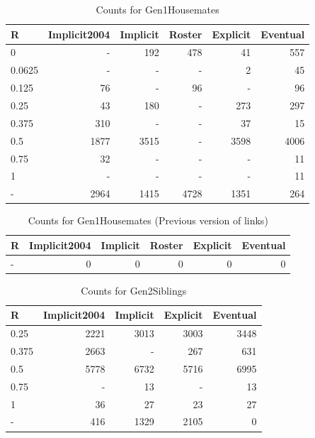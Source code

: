 \documentclass[a4paper]{article}\usepackage[]{graphicx}\usepackage[]{color}
\begin{document}
\begin{table}[ht]
\centering
\begingroup\large
\begin{tabular}{lrrrrr}
  \hline
R & Implicit2004 & Implicit & Roster & Explicit & Eventual \\ 
  \hline
0 & - & 192 & 478 &  41 & 557 \\ 
  0.0625 & - & - & - &   2 &  45 \\ 
  0.125 &  76 & - &  96 & - &  96 \\ 
  0.25 &  43 & 180 & - & 273 & 297 \\ 
  0.375 & 310 & - & - &  37 &  15 \\ 
  0.5 & 1877 & 3515 & - & 3598 & 4006 \\ 
  0.75 &  32 & - & - & - &  11 \\ 
  1 & - & - & - & - &  11 \\ 
  - & 2964 & 1415 & 4728 & 1351 & 264 \\ 
   \hline
\end{tabular}
\endgroup
\caption{Counts for Gen1Housemates} 
\end{table}
\begin{table}[ht]
\centering
\begingroup\large
\begin{tabular}{lrrrrr}
  \hline
R & Implicit2004 & Implicit & Roster & Explicit & Eventual \\ 
  \hline
- &   0 &   0 &   0 &   0 &   0 \\ 
   \hline
\end{tabular}
\endgroup
\caption{Counts for Gen1Housemates (Previous version of links)} 
\end{table}
\begin{table}[ht]
\centering
\begingroup\large
\begin{tabular}{lrrrr}
  \hline
R & Implicit2004 & Implicit & Explicit & Eventual \\ 
  \hline
0.25 & 2221 & 3013 & 3003 & 3448 \\ 
  0.375 & 2663 & - & 267 & 631 \\ 
  0.5 & 5778 & 6732 & 5716 & 6995 \\ 
  0.75 & - &  13 & - &  13 \\ 
  1 &  36 &  27 &  23 &  27 \\ 
  - & 416 & 1329 & 2105 &   0 \\ 
   \hline
\end{tabular}
\endgroup
\caption{Counts for Gen2Siblings} 
\end{table}
\end{document}
